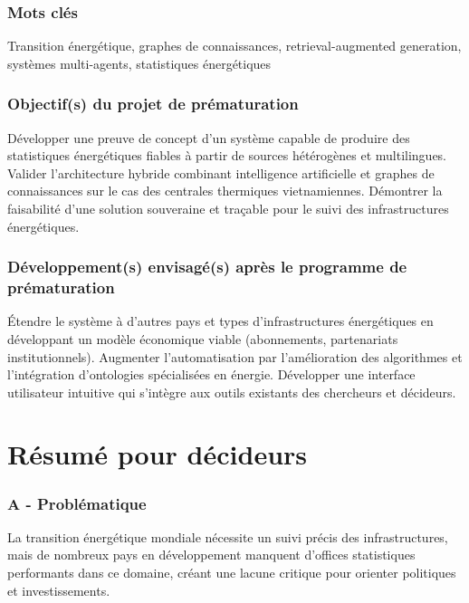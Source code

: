 \documentclass[a4paper,11pt]{report}
\begin{document}
\subsection{Mots clés}\label{mots-cluxe9s}

Transition énergétique, graphes de connaissances, retrieval-augmented generation, systèmes multi-agents, statistiques énergétiques

\subsection{Objectif(s) du projet de prématuration}\label{objectifs-du-projet-de-pruxe9maturation}

Développer une preuve de concept d'un système capable de produire des statistiques énergétiques fiables à partir de sources hétérogènes et multilingues. Valider l'architecture hybride combinant intelligence artificielle et graphes de connaissances sur le cas des centrales thermiques vietnamiennes. Démontrer la faisabilité d'une solution souveraine et traçable pour le suivi des infrastructures énergétiques.

\subsection{Développement(s) envisagé(s) après le programme de prématuration}\label{duxe9veloppements-envisaguxe9s-apruxe8s-le-programme-de-pruxe9maturation}

Étendre le système à d'autres pays et types d'infrastructures énergétiques en développant un modèle économique viable (abonnements, partenariats institutionnels). Augmenter l'automatisation par l'amélioration des algorithmes et l'intégration d'ontologies spécialisées en énergie. Développer une interface utilisateur intuitive qui s'intègre aux outils existants des chercheurs et décideurs.

\chapter{Résumé pour décideurs}\label{ruxe9sumuxe9-pour-duxe9cideurs}

\subsection{A - Problématique}\label{a---probluxe9matique}

La transition énergétique mondiale nécessite un suivi précis des infrastructures, mais de nombreux pays en développement manquent d'offices statistiques performants dans ce domaine, créant une lacune critique pour orienter politiques et investissements.
\end{document}
